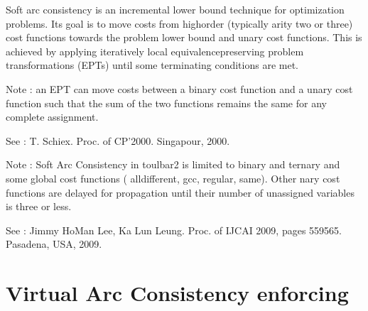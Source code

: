 \documentclass[letterpaper,10pt,openany,oneside,english]{sphinxmanual}
\begin{document}
\begin{fulllineitems}

\pysigstartsignatures
{}
\pysigstopsignatures
\sphinxAtStartPar
Soft arc consistency is an incremental lower bound technique for optimization problems. Its goal is to move costs from high\sphinxhyphen{}order (typically arity two or three) cost functions towards the problem lower bound and unary cost functions. This is achieved by applying iteratively local equivalence\sphinxhyphen{}preserving problem transformations (EPTs) until some terminating conditions are met.

\sphinxAtStartPar
Note :  an EPT can move costs between a binary cost function and a unary cost function such that the sum of the two functions remains the same for any complete assignment.

\sphinxAtStartPar
See :  T. Schiex. Proc. of CP’2000. Singapour, 2000.

\sphinxAtStartPar
Note : Soft Arc Consistency in toulbar2 is limited to binary and ternary and some global cost functions ( alldifferent, gcc, regular, same). Other n\sphinxhyphen{}ary cost functions are delayed for propagation until their number of unassigned variables is three or less.

\sphinxAtStartPar
See :  Jimmy Ho\sphinxhyphen{}Man Lee, Ka Lun Leung. Proc. of IJCAI 2009, pages 559\sphinxhyphen{}565. Pasadena, USA, 2009. 

\end{fulllineitems}



\section{Virtual Arc Consistency enforcing}
\label{\detokenize{ref/ref_modules:virtual-arc-consistency-enforcing}}
\end{document}
